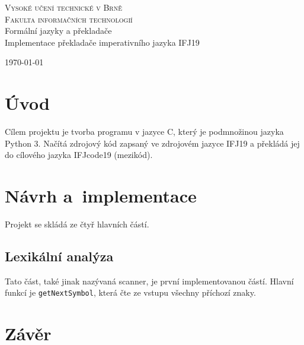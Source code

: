 \documentclass[a4paper,11pt]{article}
\begin{document}
	\begin{titlepage}
		\begin{center} \Huge \textsc{Vysoké učení technické v Brně \\ \huge Fakulta informačních technologií\\} 
			 \LARGE Formální jazyky a překladače \\ \Huge Implementace překladače imperativního jazyka IFJ19  
			
			\end{center}	

		{\LARGE \today}
	\end{titlepage}
	\newpage
	\tableofcontents
    \newpage


\section{Úvod}
Cílem projektu je tvorba programu v jazyce C, který  je podmnožinou jazyka Python 3. Načítá zdrojový kód zapsaný ve zdrojovém jazyce IFJ19 a překládá jej do cílového jazyka IFJcode19 (mezikód).

\section{Návrh a~implementace}
Projekt se skládá ze čtyř hlavních částí. 

\subsection{Lexikální analýza}
Tato část, také jinak nazývaná scanner, je první implementovanou částí. Hlavní funkcí je \texttt{getNextSymbol}, která čte ze vstupu všechny příchozí znaky.

\section{Závěr}



\newpage

\end{document}
